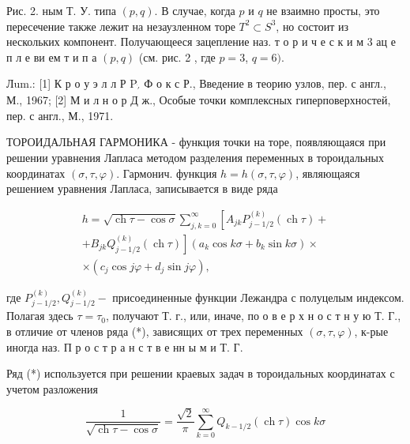 \documentclass[10pt]{article}
\begin{document}
Рис. 2. ным Т. У. типа $(p, q)$. В случае, когда $p$ и $q$ не взаимно просты, это пересечение также лежит на незаузленном торе $T^{2} \subset S^{3}$, но состоит из нескольких компонент. Получающееся зацепление наз. т о р и ч е с к и м 3 ац е п л е ви ем т и п а $(p, q)$ (см. рис. 2 , где $p=3$, $q=6)$.



Лum.: [1] К р о у э л л Р $\mathrm{P}_{\dot{\prime}}$ Ф о к с Р., Введение в теорию узлов, пер. с англ., М., 1967; [2] М и л н о р Д ж., Особые точки комплексных гиперповерхностей, пер. с англ., М., 1971.



ТОРОИДАЛЬНАЯ ГАРМОНИКА - функция точки на торе, появляющаяся при решении уравнения Лапласа методом разделения переменных в тороидальных координатах $(\sigma, \tau, \varphi)$. Гармонич. функция $h=h(\sigma, \tau, \varphi)$, являющаяся решением уравнения Лапласа, записывается в виде ряда



\[

\begin{gathered}

h=\sqrt{\operatorname{ch} \tau-\cos \sigma} \sum_{j, k=0}^{\infty}\left[A_{j k} P_{j-1 / 2}^{(k)}(\operatorname{ch} \tau)+\right. \\

\left.+B_{j k} Q_{j-1 / 2}^{(k)}(\operatorname{ch} \tau)\right]\left(a_{k} \cos k \sigma+b_{k} \sin k \sigma\right) \times \\

\times\left(c_{j} \cos j \varphi+d_{j} \sin j \varphi\right),

\end{gathered}

\]



где $P_{j-1 / 2}^{(k)}, Q_{j-1 / 2}^{(k)}-$ присоединенные функции Лежандра с полуцелым индексом. Полагая здесь $\tau=\tau_{0}$, получают Т. г., или, иначе, по о в е р х н о с т н у ю Т. Г., в отличие от членов ряда (*), зависящих от трех переменных $(\sigma, \tau, \varphi)$, к-рые иногда наз. П р о с т р а н с т в е нн ы м и Т. Г.



Ряд (*) используется при решении краевых задач в тороидальных координатах с учетом разложения



\[

\frac{1}{\sqrt{\operatorname{ch} \tau-\cos \sigma}}=\frac{\sqrt{2}}{\pi} \sum_{k=0}^{\infty} Q_{k-1 / 2}(\operatorname{ch} \tau) \cos k \sigma

\]
\end{document}
